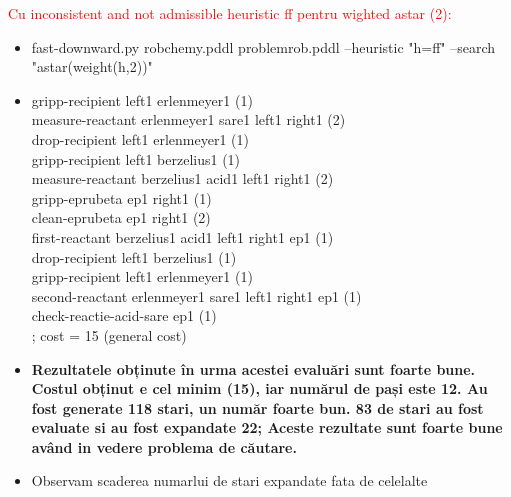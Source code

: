 \textcolor{red}{Cu inconsistent and not admissible heuristic ff pentru wighted astar (2):}
   \begin{itemize}
    \setlength\itemsep{0em}
    \item   fast-downward.py robchemy.pddl problemrob.pddl --heuristic "h=ff" --search "astar(weight(h,2))"
    \item gripp-recipient left1 erlenmeyer1 (1)\\
measure-reactant erlenmeyer1 sare1 left1 right1 (2)\\
drop-recipient left1 erlenmeyer1 (1)\\
gripp-recipient left1 berzelius1 (1)\\
measure-reactant berzelius1 acid1 left1 right1 (2)\\
gripp-eprubeta ep1 right1 (1)\\
clean-eprubeta ep1 right1 (2)\\
first-reactant berzelius1 acid1 left1 right1 ep1 (1)\\
drop-recipient left1 berzelius1 (1)\\
gripp-recipient left1 erlenmeyer1 (1)\\
second-reactant erlenmeyer1 sare1 left1 right1 ep1 (1)\\
check-reactie-acid-sare ep1 (1)\\
; cost = 15 (general cost)
    \item \textbf{Rezultatele obținute în urma acestei evaluări sunt foarte bune. Costul obținut e cel minim (15), iar numărul de pași este 12. Au fost generate 118 stari, un număr foarte bun. 83 de stari au fost evaluate si au fost expandate 22; Aceste rezultate sunt foarte bune având in vedere problema de căutare.}
    \item Observam scaderea numarlui de stari expandate fata de celelalte
\end{itemize}


